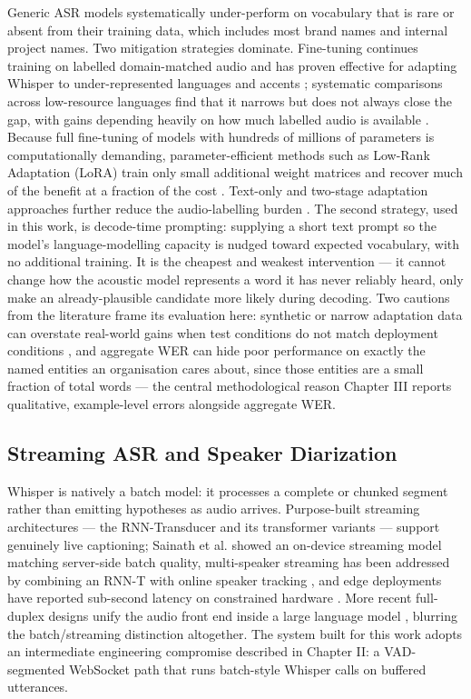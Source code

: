 \documentclass[12pt]{report}
\begin{document}
Generic ASR models systematically under-perform on vocabulary that is rare or absent from their training data, which includes most brand names and internal project names. Two mitigation strategies dominate. Fine-tuning continues training on labelled domain-matched audio and has proven effective for adapting Whisper to under-represented languages and accents \cite{daouad2024optimizing,polat2024implementation}; systematic comparisons across low-resource languages find that it narrows but does not always close the gap, with gains depending heavily on how much labelled audio is available \cite{whisperfinetune2024}. Because full fine-tuning of models with hundreds of millions of parameters is computationally demanding, parameter-efficient methods such as Low-Rank Adaptation (LoRA) train only small additional weight matrices and recover much of the benefit at a fraction of the cost \cite{ankita2026exploring}. Text-only and two-stage adaptation approaches further reduce the audio-labelling burden \cite{fang2025textonly,zheng2026twostage}. The second strategy, used in this work, is decode-time prompting: supplying a short text prompt so the model's language-modelling capacity is nudged toward expected vocabulary, with no additional training. It is the cheapest and weakest intervention --- it cannot change how the acoustic model represents a word it has never reliably heard, only make an already-plausible candidate more likely during decoding. Two cautions from the literature frame its evaluation here: synthetic or narrow adaptation data can overstate real-world gains when test conditions do not match deployment conditions \cite{tran2025das}, and aggregate WER can hide poor performance on exactly the named entities an organisation cares about, since those entities are a small fraction of total words \cite{durmus2026contextual} --- the central methodological reason Chapter III reports qualitative, example-level errors alongside aggregate WER.

\subsection{Streaming ASR and Speaker Diarization}

Whisper is natively a batch model: it processes a complete or chunked segment rather than emitting hypotheses as audio arrives. Purpose-built streaming architectures --- the RNN-Transducer and its transformer variants \cite{moritz2020streaming,tsunoo2021streaming,chen2021developing} --- support genuinely live captioning; Sainath et al. \cite{sainath2020streaming} showed an on-device streaming model matching server-side batch quality, multi-speaker streaming has been addressed by combining an RNN-T with online speaker tracking \cite{sklyar2021streaming}, and edge deployments have reported sub-second latency on constrained hardware \cite{dileo2025realtime}. More recent full-duplex designs unify the audio front end inside a large language model \cite{li2026uaf}, blurring the batch/streaming distinction altogether. The system built for this work adopts an intermediate engineering compromise described in Chapter II: a VAD-segmented WebSocket path that runs batch-style Whisper calls on buffered utterances.
\end{document}
